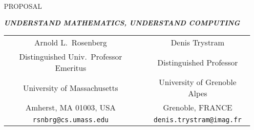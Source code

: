 \documentclass{article}[12pt]
\begin{document}
\begin{center}
PROPOSAL 

\bigskip

{\large\bf\em UNDERSTAND MATHEMATICS, UNDERSTAND COMPUTING}
\end{center}

\begin{center}
\begin{tabular}{ccc}
{\large Arnold L.~Rosenberg} & & {\large Denis Trystram} \\
Distinguished Univ.~Professor Emeritus
  & & Distinguished Professor \\
University of Massachusetts  & & University of Grenoble Alpes \\
Amherst, MA 01003, USA       & & Grenoble, FRANCE \\
{\small\tt rsnbrg@cs.umass.edu} & & {\small\tt denis.trystram@imag.fr}
\end{tabular}
\end{center}

\bigskip
\end{document}
